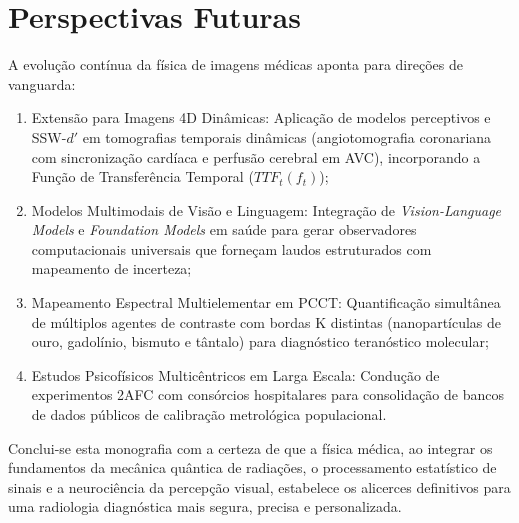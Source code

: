 \documentclass[
  12pt,
  a4paper,
  oneside
]{report}
\begin{document}
\section{Perspectivas Futuras}
\label{sec:perspectivas_futuras_finais}
A evolução contínua da física de imagens médicas aponta para direções de vanguarda:
\begin{enumerate}
  \item Extensão para Imagens 4D Dinâmicas: Aplicação de modelos perceptivos e SSW-$d'$ em tomografias temporais dinâmicas (angiotomografia coronariana com sincronização cardíaca e perfusão cerebral em AVC), incorporando a Função de Transferência Temporal ($TTF_t(f_t)$);
  \item Modelos Multimodais de Visão e Linguagem: Integração de \emph{Vision-Language Models} e \emph{Foundation Models} em saúde para gerar observadores computacionais universais que forneçam laudos estruturados com mapeamento de incerteza;
  \item Mapeamento Espectral Multielementar em PCCT: Quantificação simultânea de múltiplos agentes de contraste com bordas K distintas (nanopartículas de ouro, gadolínio, bismuto e tântalo) para diagnóstico teranóstico molecular;
  \item Estudos Psicofísicos Multicêntricos em Larga Escala: Condução de experimentos 2AFC com consórcios hospitalares para consolidação de bancos de dados públicos de calibração metrológica populacional.
\end{enumerate}

Conclui-se esta monografia com a certeza de que a física médica, ao integrar os fundamentos da mecânica quântica de radiações, o processamento estatístico de sinais e a neurociência da percepção visual, estabelece os alicerces definitivos para uma radiologia diagnóstica mais segura, precisa e personalizada.
\end{document}
